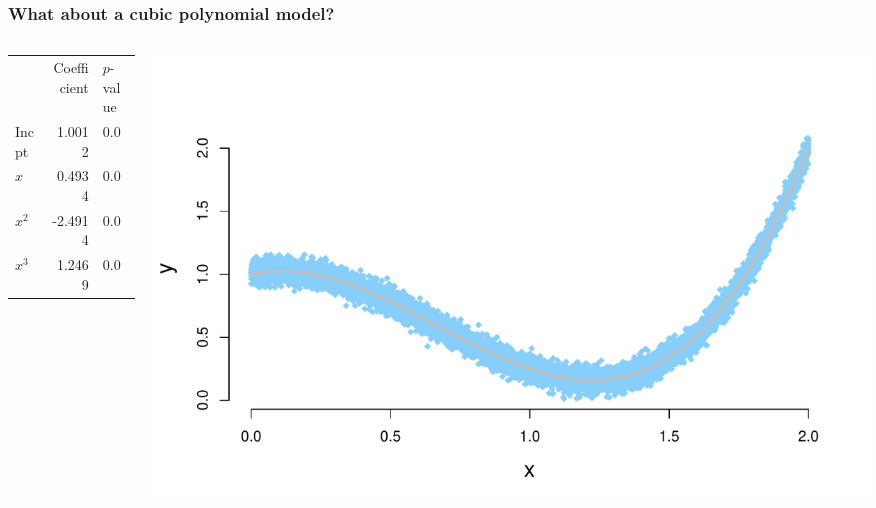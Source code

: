 \documentclass[aspectratio=169]{beamer}
\theoremstyle{principle}
\begin{document}
\begin{frame}
\frametitle{What about a \textbf{cubic polynomial} model?}

\begin{columns}
\begin{column}{0.3\textwidth}

\begin{center}
\begin{tabular}{ lrl } 
\hline
\hline
 & Coefficient & $p$-value\\ 
Incpt & 1.0012 &0.0\\ 
$x$ & 0.4934 &0.0\\ 
$x^2$ & -2.4914 &0.0\\ 
$x^3$ & 1.2469 &0.0\\ 
\hline
\hline
\end{tabular}
\end{center}

\end{column}
\begin{column}{0.7\textwidth}

\begin{center}
\includegraphics[scale=0.5]{crazy_curve_x3.pdf}
\end{center}

\end{column}
\end{columns}

\end{frame}
\end{document}
